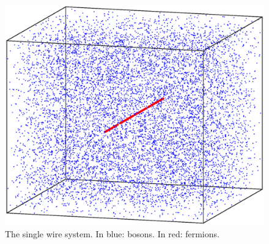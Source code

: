 \documentclass[11pt, twoside]{Thesis}
\begin{document}
\vspace{2.5cm}

\begin{figure}[H]
\center
\includegraphics[width=0.8\columnwidth]{gasand1wire.eps}
\\ The single wire system. In blue: bosons. In red: fermions.   
\end{figure}

\newpage


 
 
 
 
\end{document}
